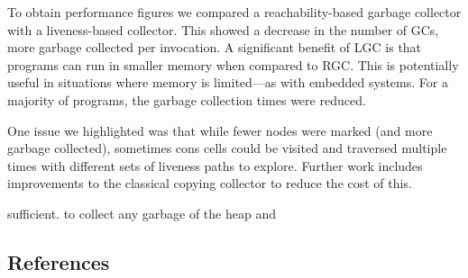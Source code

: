 \documentclass[9pt]{sigplanconf}
\begin{document}
To obtain performance figures we compared a reachability-based garbage
collector with a liveness-based  collector.  This showed a decrease in
the  number  of  GCs,   more  garbage  collected  per  invocation.   A
significant benefit of LGC is  that programs can run in smaller memory
when compared to  RGC. This is potentially useful  in situations where
memory  is  limited---as with  embedded  systems.  For  a majority  of
programs, the garbage collection times were reduced.

One issue we  highlighted was that while fewer  nodes were marked (and
more garbage collected), sometimes  cons cells could be visited and
traversed  multiple times  with different  sets of  liveness  paths to
explore.  Further work includes  improvements to the classical copying
collector to reduce the cost of this.



sufficient.
to collect any garbage
of the heap and

\subsection{References}
{}

\end{document}
